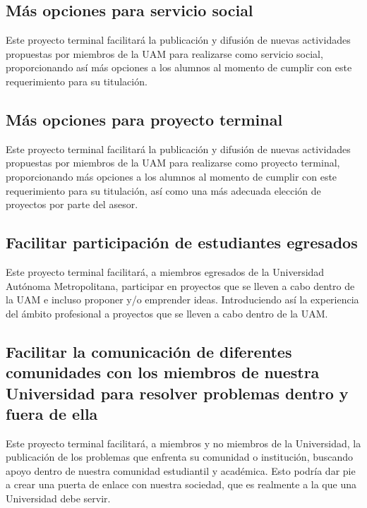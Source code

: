 \documentclass[12pt,letterpaper,titlepage]{article}
\begin{document}

\subsection{M\'as opciones para servicio social}
Este proyecto terminal facilitar\'a la publicaci\'on y difusi\'on de nuevas actividades propuestas por miembros de la UAM para realizarse como servicio social, proporcionando as\'i m\'as opciones a los alumnos al momento de cumplir con este requerimiento para su titulaci\'on.

\subsection{M\'as opciones para proyecto terminal}
Este proyecto terminal facilitar\'a la publicaci\'on y difusi\'on de nuevas actividades propuestas por miembros de la UAM para realizarse como proyecto terminal, proporcionando m\'as opciones a los alumnos al momento de cumplir con este requerimiento para su titulaci\'on, as\'i como una m\'as adecuada elecci\'on de proyectos por parte del asesor.

\subsection{Facilitar participaci\'on de estudiantes egresados}
Este proyecto terminal facilitar\'a, a miembros egresados de la Universidad Aut\'onoma Metropolitana, participar en proyectos que se lleven a cabo dentro de la UAM e incluso proponer y/o emprender ideas. Introduciendo as\'i la experiencia del \'ambito profesional a proyectos que se lleven a cabo dentro de la UAM.

\subsection{Facilitar la comunicaci\'on de diferentes comunidades con los miembros de nuestra Universidad para resolver problemas dentro y fuera de ella}
Este proyecto terminal facilitar\'a, a miembros y no miembros de la Universidad, la publicaci\'on de los problemas que enfrenta su comunidad o instituci\'on, buscando apoyo dentro de nuestra comunidad estudiantil y acad\'emica. Esto podr\'ia dar pie a crear una puerta de enlace con nuestra sociedad, que es realmente a la que una Universidad debe servir.
\end{document}
